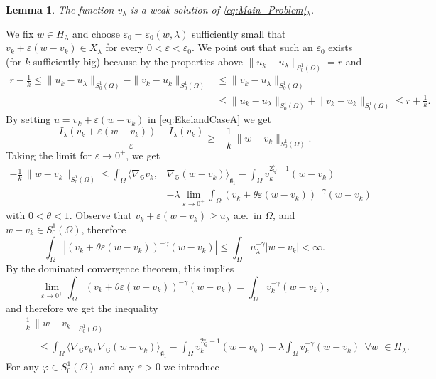\documentclass[11pt]{amsart}
\numberwithin{equation}{section} %
\newtheorem{lemma}[teo]{Lemma}
\theoremstyle{definition}
\def\G{\mathbb{G}}
\begin{document}
\begin{lemma}\label{lem:casoa1}
	The function $v_\lambda$ is a weak solution of \eqref{eq:Main_Problem}$_\lambda$.
\end{lemma}
\proof
We fix $w\in H_\lambda$ and choose $\varepsilon_0=\varepsilon_0(w,\lambda)$
sufficiently small that $v_k+\varepsilon(w-v_k)\in X_\lambda$ for every $0<\varepsilon<\varepsilon_0$.
We point out that such an $\varepsilon_0$ exists (for $k$ sufficiently big)
because by the properties above $\|u_k-u_\lambda\|_{S^1_0(\Omega)}=r$ and
\begin{align*}
 r-\frac{1}{k}\leq \|u_k-u_\lambda\|_{S^1_0(\Omega)}-\|v_k-u_k\|_{S^1_0(\Omega)}&\leq \|v_k-u_\lambda\|_{S^1_0(\Omega)}\\
& \leq \|u_k-u_\lambda\|_{S^1_0(\Omega)}+\|v_k-u_k\|_{S^1_0(\Omega)}\leq r+\frac{1}{k}.
\end{align*}
By setting $u=v_k+\varepsilon(w-v_k)$ in \eqref{eq:EkelandCaseA}
we get
\[
\frac{I_\lambda(v_k+\varepsilon(w-v_k))-I_\lambda(v_k)}{\varepsilon}\geq -\frac{1}{k}\, \|w-v_k\|_{S^1_0(\Omega)}.
\]
Taking the limit for $\varepsilon\to0^+$, we get
\[
\begin{split}
-\frac{1}{k}\,\|w-v_k\|_{S^1_0(\Omega)}\leq \int_\Omega\langle \nabla_\G v_k,&\nabla_\G(w-v_k)\rangle_{\mathfrak{g}_{1}}-\int_\Omega v_k^{2^\star_Q-1}(w-v_k)\\
&-\lambda\lim_{\varepsilon\to0^+} \int_\Omega (v_k+\theta \varepsilon(w-v_k))^{-\gamma}(w-v_k)
\end{split}
\]
with $0<\theta<1$. Observe that $v_k+\varepsilon(w-v_k)\geq u_\lambda$ a.e.~in $\Omega$,
and $w-v_k\in S^1_0(\Omega)$, 
therefore 
\[
\int_\Omega \left| (v_k+\theta\varepsilon(w-v_k))^{-\gamma}(w-v_k)\right|\leq \int_\Omega u_\lambda^{-\gamma}|w-v_k|<\infty.
\]
By the dominated convergence theorem, this implies
\[
\lim_{\varepsilon\to0^+}\int_\Omega(v_k+\theta\varepsilon(w-v_k))^{-\gamma}(w-v_k)=\int_\Omega v_k^{-\gamma}(w-v_k),
\]
and therefore we get the inequality
\begin{equation}\label{eq:ineq2.21haitao}
\begin{split}
	& -\frac{1}{k}\, \|w-v_k\|_{S^1_0(\Omega)}\\
	& \qquad\leq \int_\Omega\langle \nabla_\G v_k,\nabla_\G(w-v_k)\rangle_{\mathfrak{g}_{1}}-\int_\Omega v_k^{2^\star_Q-1}(w-v_k)
	-\lambda \int_\Omega v_k^{-\gamma}(w-v_k)\ \ \forall w\,\,\in H_\lambda.
	\end{split}
	\end{equation}
For any $\varphi\in S^1_0(\Omega)$ and any $\varepsilon>0$ we introduce
\end{document}
